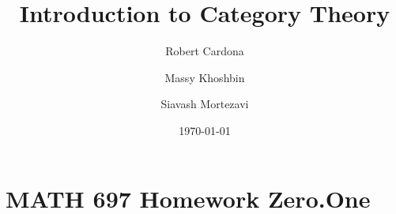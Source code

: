 \documentclass[8pt]{amsart}
\theoremstyle{plain}%
\theoremstyle{definition}
\theoremstyle{remark}
\numberwithin{equation}{section}
\begin{document}
\title[MATH 697]{Introduction to Category Theory}


\author{
	Robert Cardona %
	\and
	Massy Khoshbin %
	\and
	Siavash Mortezavi %
}


\address{Department of Mathematics \\ California State University Long Beach}

\date{\today}


\maketitle

\setcounter{section}{-1}
\section{MATH 697 Homework Zero.One}
\end{document}
